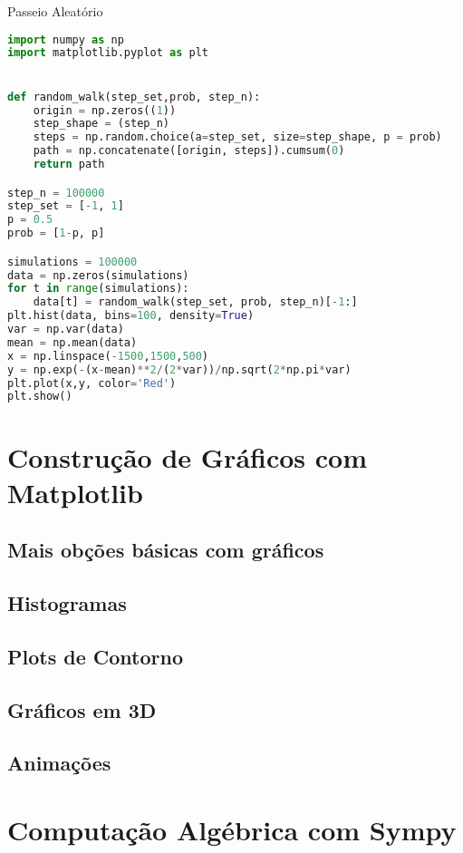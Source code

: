 \documentclass[12pt,a4paper,titlepage,portuges,twoside,final]{book}
\begin{document}
Passeio Aleatório

\begin{lstlisting}[language=Python, frame=lines,basicstyle=\footnotesize, caption={Histogram da Distribuição de Probabilidade da caminhada Aleatória}, label={lst:RW}]
import numpy as np
import matplotlib.pyplot as plt


def random_walk(step_set,prob, step_n):
    origin = np.zeros((1)) 
    step_shape = (step_n)
    steps = np.random.choice(a=step_set, size=step_shape, p = prob)
    path = np.concatenate([origin, steps]).cumsum(0)
    return path

step_n = 100000
step_set = [-1, 1]
p = 0.5
prob = [1-p, p]

simulations = 100000
data = np.zeros(simulations)
for t in range(simulations):
    data[t] = random_walk(step_set, prob, step_n)[-1:]
plt.hist(data, bins=100, density=True)
var = np.var(data)
mean = np.mean(data)
x = np.linspace(-1500,1500,500)
y = np.exp(-(x-mean)**2/(2*var))/np.sqrt(2*np.pi*var)
plt.plot(x,y, color='Red')
plt.show()    

\end{lstlisting}


\chapter{Construção de Gráficos com Matplotlib}
\section{Mais obções básicas com gráficos}
\section{Histogramas}
\section{Plots de Contorno}
\section{Gráficos em 3D}
\section{Animações}

\chapter{Computação Algébrica com Sympy}
\end{document}
